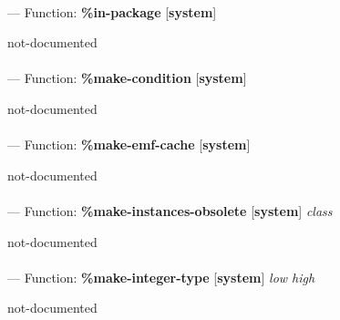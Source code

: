 \paragraph{}
\label{SYSTEM:IN-PACKAGE}
--- Function: \textbf{\%in-package} [\textbf{system}] \textit{}

\begin{adjustwidth}{5em}{5em}
not-documented
\end{adjustwidth}

\paragraph{}
\label{SYSTEM:MAKE-CONDITION}
--- Function: \textbf{\%make-condition} [\textbf{system}] \textit{}

\begin{adjustwidth}{5em}{5em}
not-documented
\end{adjustwidth}

\paragraph{}
\label{SYSTEM:MAKE-EMF-CACHE}
--- Function: \textbf{\%make-emf-cache} [\textbf{system}] \textit{}

\begin{adjustwidth}{5em}{5em}
not-documented
\end{adjustwidth}

\paragraph{}
\label{SYSTEM:MAKE-INSTANCES-OBSOLETE}
--- Function: \textbf{\%make-instances-obsolete} [\textbf{system}] \textit{class}

\begin{adjustwidth}{5em}{5em}
not-documented
\end{adjustwidth}

\paragraph{}
\label{SYSTEM:MAKE-INTEGER-TYPE}
--- Function: \textbf{\%make-integer-type} [\textbf{system}] \textit{low high}

\begin{adjustwidth}{5em}{5em}
not-documented
\end{adjustwidth}

